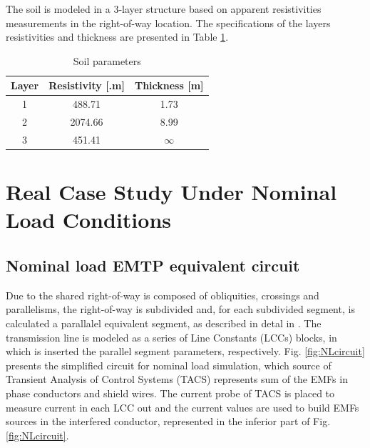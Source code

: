 \documentclass{IEEEtran4PSCC}
\begin{document}
The soil is modeled in a 3-layer structure based on apparent resistivities measurements in the right-of-way location. The specifications of the layers resistivities and thickness are presented in Table \ref{tab:SoilParameters}.

 
\begin{table}[h]
	\renewcommand{\arraystretch}{1.3}
	\centering
	\caption{Soil parameters}
	\footnotesize
	\begin{tabular}{ccc}
		\hline
		\textbf{Layer}         & \textbf{Resistivity [\boldmath{$\Omega$}.m]} & \textbf{Thickness [m]}  \\ \hline
		1     & 488.71                        & 1.73                       \\ 
		2     & 2074.66                         & 8.99                               \\
		3     & 451.41                           & $\infty$                         \\ \hline
	\end{tabular}
	\label{tab:SoilParameters}
\end{table}

\section{Real Case Study Under Nominal Load Conditions}

\subsection{Nominal load EMTP equivalent circuit}

Due to the shared right-of-way is composed of obliquities, crossings and parallelisms, the right-of-way is subdivided and, for each subdivided segment, is calculated a parallalel equivalent segment, as described in detal in \cite{Moraes2020}. The transmission line is modeled as a series of Line Constants (LCCs) blocks, in which is inserted the parallel segment parameters, respectively. Fig. \ref{fig:NLcircuit} presents the simplified circuit for nominal load simulation, which source of Transient Analysis of Control Systems (TACS) represents sum of the EMFs in phase conductors and shield wires. The current probe of TACS is placed to measure current in each LCC out and the current values are used to build EMFs sources in the interfered conductor, represented in the inferior part of Fig. \ref{fig:NLcircuit}.
\end{document}
